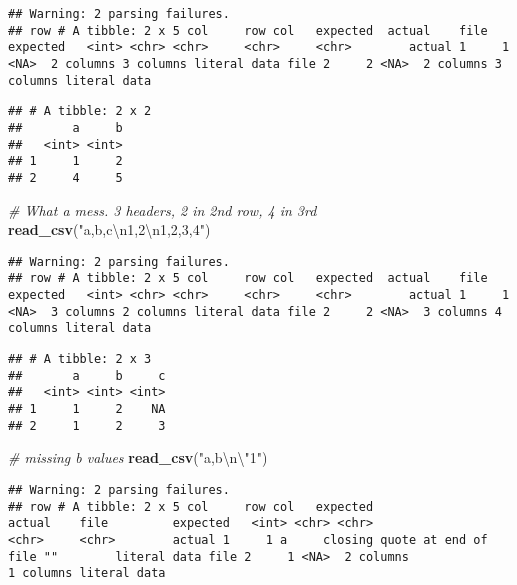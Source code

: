 \documentclass[]{article}
\newenvironment{Shaded}{\begin{snugshade}}{\end{snugshade}}
\newcommand{\KeywordTok}[1]{\textcolor[rgb]{0.13,0.29,0.53}{\textbf{#1}}}
\newcommand{\CharTok}[1]{\textcolor[rgb]{0.31,0.60,0.02}{#1}}
\newcommand{\StringTok}[1]{\textcolor[rgb]{0.31,0.60,0.02}{#1}}
\newcommand{\CommentTok}[1]{\textcolor[rgb]{0.56,0.35,0.01}{\textit{#1}}}
\newcommand{\NormalTok}[1]{#1}
\begin{document}
\begin{verbatim}
## Warning: 2 parsing failures.
## row # A tibble: 2 x 5 col     row col   expected  actual    file         expected   <int> <chr> <chr>     <chr>     <chr>        actual 1     1 <NA>  2 columns 3 columns literal data file 2     2 <NA>  2 columns 3 columns literal data
\end{verbatim}

\begin{verbatim}
## # A tibble: 2 x 2
##       a     b
##   <int> <int>
## 1     1     2
## 2     4     5
\end{verbatim}

\begin{Shaded}
\begin{Highlighting}[]
\CommentTok{# What a mess. 3 headers, 2 in 2nd row, 4 in 3rd}
\KeywordTok{read_csv}\NormalTok{(}\StringTok{"a,b,c}\CharTok{\textbackslash{}n}\StringTok{1,2}\CharTok{\textbackslash{}n}\StringTok{1,2,3,4"}\NormalTok{)}
\end{Highlighting}
\end{Shaded}

\begin{verbatim}
## Warning: 2 parsing failures.
## row # A tibble: 2 x 5 col     row col   expected  actual    file         expected   <int> <chr> <chr>     <chr>     <chr>        actual 1     1 <NA>  3 columns 2 columns literal data file 2     2 <NA>  3 columns 4 columns literal data
\end{verbatim}

\begin{verbatim}
## # A tibble: 2 x 3
##       a     b     c
##   <int> <int> <int>
## 1     1     2    NA
## 2     1     2     3
\end{verbatim}

\begin{Shaded}
\begin{Highlighting}[]
\CommentTok{# missing b values}
\KeywordTok{read_csv}\NormalTok{(}\StringTok{"a,b}\CharTok{\textbackslash{}n\textbackslash{}"}\StringTok{1"}\NormalTok{)}
\end{Highlighting}
\end{Shaded}

\begin{verbatim}
## Warning: 2 parsing failures.
## row # A tibble: 2 x 5 col     row col   expected                     actual    file         expected   <int> <chr> <chr>                        <chr>     <chr>        actual 1     1 a     closing quote at end of file ""        literal data file 2     1 <NA>  2 columns                    1 columns literal data
\end{verbatim}
\end{document}
